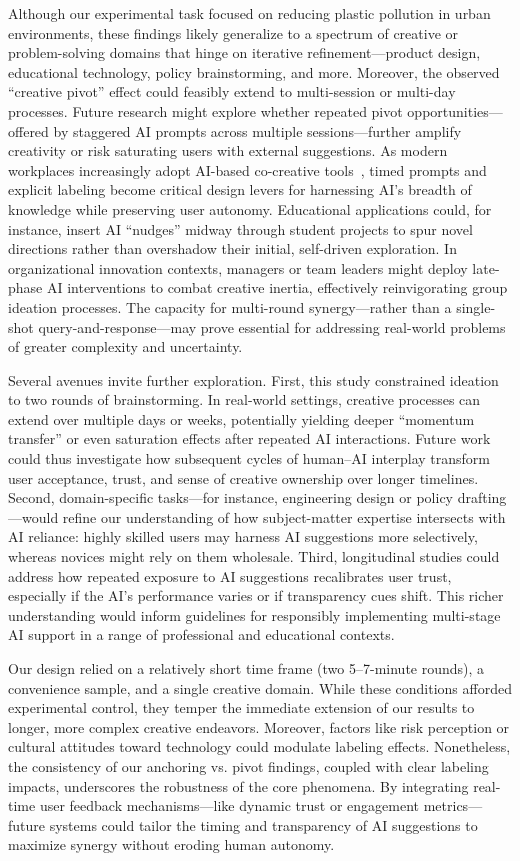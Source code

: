 \documentclass{article}
\begin{document}
Although our experimental task focused on reducing plastic pollution in urban environments, these findings likely generalize to a spectrum of creative or problem-solving domains that hinge on iterative refinement—product design, educational technology, policy brainstorming, and more. Moreover, the observed “creative pivot” effect could feasibly extend to multi-session or multi-day processes. Future research might explore whether repeated pivot opportunities—offered by staggered AI prompts across multiple sessions—further amplify creativity or risk saturating users with external suggestions. As modern workplaces increasingly adopt AI-based co-creative tools~\cite{ma2024human,fui2023generative}, timed prompts and explicit labeling become critical design levers for harnessing AI’s breadth of knowledge while preserving user autonomy. Educational applications could, for instance, insert AI “nudges” midway through student projects to spur novel directions rather than overshadow their initial, self-driven exploration. In organizational innovation contexts, managers or team leaders might deploy late-phase AI interventions to combat creative inertia, effectively reinvigorating group ideation processes. The capacity for multi-round synergy—rather than a single-shot query-and-response—may prove essential for addressing real-world problems of greater complexity and uncertainty.

Several avenues invite further exploration. First, this study constrained ideation to two rounds of brainstorming. In real-world settings, creative processes can extend over multiple days or weeks, potentially yielding deeper “momentum transfer” or even saturation effects after repeated AI interactions. Future work could thus investigate how subsequent cycles of human–AI interplay transform user acceptance, trust, and sense of creative ownership over longer timelines. Second, domain-specific tasks—for instance, engineering design or policy drafting—would refine our understanding of how subject-matter expertise intersects with AI reliance: highly skilled users may harness AI suggestions more selectively, whereas novices might rely on them wholesale. Third, longitudinal studies could address how repeated exposure to AI suggestions recalibrates user trust, especially if the AI’s performance varies or if transparency cues shift. This richer understanding would inform guidelines for responsibly implementing multi-stage AI support in a range of professional and educational contexts.

Our design relied on a relatively short time frame (two 5–7-minute rounds), a convenience sample, and a single creative domain. While these conditions afforded experimental control, they temper the immediate extension of our results to longer, more complex creative endeavors. Moreover, factors like risk perception or cultural attitudes toward technology could modulate labeling effects. Nonetheless, the consistency of our anchoring vs. pivot findings, coupled with clear labeling impacts, underscores the robustness of the core phenomena. By integrating real-time user feedback mechanisms—like dynamic trust or engagement metrics—future systems could tailor the timing and transparency of AI suggestions to maximize synergy without eroding human autonomy.
\end{document}
